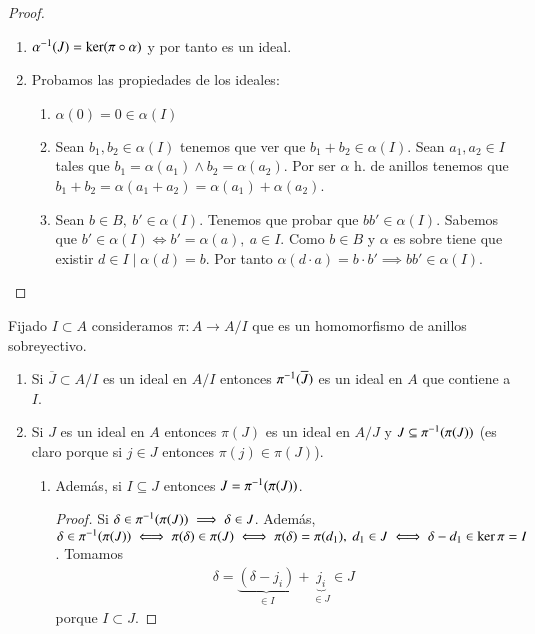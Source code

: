 \begin{proof}
	\begin{figure}[h]
		\centering
	\end{figure}
	\begin{enumerate}
		\item $\alpha^{-1}(J) = \ker(\pi \circ \alpha)$ y por tanto es un ideal.
		\item Probamos las propiedades de los ideales:
		\begin{enumerate}
			\item $\alpha(0) = 0 \in \alpha(I)$
			\item Sean $b_1, b_2 \in \alpha(I)$ tenemos que ver que $b_1 + b_2 \in \alpha(I)$. Sean $a_1, a_2 \in I$ tales que $b_1 = \alpha(a_1) \land b_2 = \alpha(a_2)$. Por ser $\alpha$ h. de anillos tenemos que $b_1 + b_2 = \alpha(a_1 + a_2) = \alpha(a_1) + \alpha(a_2)$.
			\item Sean $b \in B,\ b' \in \alpha(I)$. Tenemos que probar que $bb' \in \alpha(I)$. Sabemos que $b' \in \alpha(I) \iff b' = \alpha(a),\ a \in I$. Como $b \in B$ y $\alpha$ es sobre tiene que existir $d \in I \mid \alpha(d) = b$. Por tanto $\alpha(d\cdot a) = b \cdot b' \implies bb' \in \alpha(I)$.
		\end{enumerate}
	\end{enumerate}
\end{proof}

Fijado $I \subset A$ consideramos $\pi:A \to A/I$ que es un homomorfismo de anillos sobreyectivo.

\begin{enumerate}
	\item Si $\overline{J} \subset A /I$ es un ideal en $A / I$ entonces $\pi^{-1}(\overline{J})$ es un ideal en $A$ que contiene a $I$.
	\item Si $J$ es un ideal en $A$ entonces $\pi(J)$ es un ideal en $A/J$ y $J \subseteq \pi^{-1}(\pi(J))$ (es claro porque si $j \in J$ entonces $\pi(j) \in \pi(J)$).
	\begin{enumerate}
		\item Además, si $I \subseteq J$ entonces $J = \pi^{-1}(\pi(J))$.
		\begin{proof}
			Si $\delta \in \pi^{-1}(\pi(J)) \implies \delta \in J$. Además, $\delta \in \pi^{-1}(\pi(J)) \iff \pi(\delta) \in \pi(J) \iff \pi(\delta) = \pi(d_1),\ d_1 \in J \iff \delta - d_1 \in \ker \pi = I$. Tomamos
			\begin{align*}
			\delta = \underbrace{(\delta - j_i)}_{\in I} + \underbrace{j_i}_{\in J} \in J
			\end{align*}
			porque $I \subset J$.
		\end{proof}
	\end{enumerate}
\end{enumerate}


